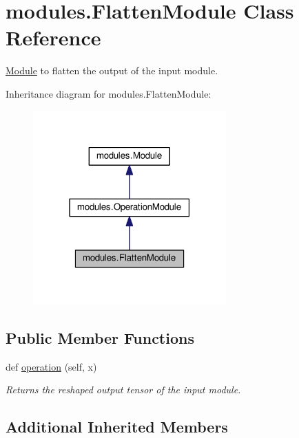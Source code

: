 \hypertarget{classmodules_1_1_flatten_module}{}\section{modules.\+Flatten\+Module Class Reference}
\label{classmodules_1_1_flatten_module}


\hyperlink{classmodules_1_1_module}{Module} to flatten the output of the input module.  




Inheritance diagram for modules.\+Flatten\+Module\+:\nopagebreak
\begin{figure}[H]
\begin{center}
\leavevmode
\includegraphics[width=210pt]{classmodules_1_1_flatten_module__inherit__graph}
\end{center}
\end{figure}
\subsection*{Public Member Functions}
\begin{DoxyCompactItemize}
\item 
\mbox{\label{classmodules_1_1_flatten_module_a591c52c7ecfcd1f52730d5eb453199d2}} 
def \hyperlink{classmodules_1_1_flatten_module_a591c52c7ecfcd1f52730d5eb453199d2}{operation} (self, x)
\begin{DoxyCompactList}\small\item\em Returns the reshaped output tensor of the input module. \end{DoxyCompactList}\end{DoxyCompactItemize}
\subsection*{Additional Inherited Members}


